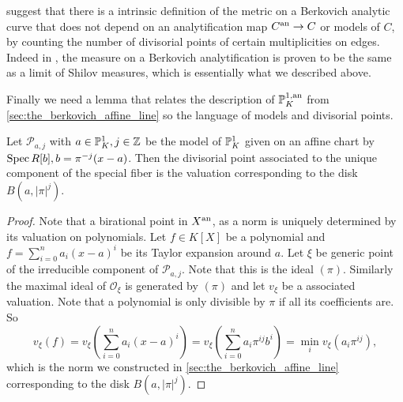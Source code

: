 \begin{remark}
	 suggest that there is a intrinsic definition of the metric on a Berkovich analytic curve that does not depend on an analytification map $ C{}^{\text{an}} \to C$ or models of $C$, by counting the number of divisorial points of certain multiplicities on edges. 
	Indeed in \cite{jonssonConvergenceAdicPluricanonical2020a}, the measure on a Berkovich analytification is proven to be the same as a limit of Shilov measures, which is essentially what we described above. 
\end{remark}

Finally we need a lemma that relates the description of $\mathbb{P}^{1, \text{an}}_{K}$ from \cref{sec:the_berkovich_affine_line} so the language of models and divisorial points. 

\begin{lemma}\label{lem:model_disk_proj_line}
	Let $\mathscr P_{a,j}$ with $a \in \mathbb{P}_K^{1}, j \in \mathbb{Z}$ be the model of $\mathscr {\mathbb{P}}_{K}^{1}$ given on an affine chart by $\operatorname{Spec} R[b], b = \pi^{-j}(x - a)$.
	Then the divisorial point associated to the unique component of the special fiber is the valuation corresponding to the disk $B(a, |\pi|^{j})$. 
\end{lemma}
\begin{proof}
	Note that a birational point in $X{}^{\text{an}}$, as a norm is uniquely determined by its valuation on polynomials. 
	Let $f \in K[X]$ be a polynomial and $f = \sum_{i = 0}^{n} a_i (x - a)^{i} $ be its Taylor expansion around $a$. 
	Let $\xi$ be generic point of the irreducible component of $\mathscr P_{a, j}$. 
	Note that this is the ideal $(\pi)$.
	Similarly the maximal ideal of $\mathcal{O}_{\xi}$ is generated by $(\pi)$ and let $v_{\xi}$ be a associated valuation.
	Note that a polynomial is only divisible by $\pi$ if all its coefficients are.
	So \[
		v_\xi(f) = v_\xi\left( \sum_{i = 0}^{n} a_{i} (x-a)^{i} \right) = v_\xi\left( \sum_{i = 0}^{n} a_i\pi^{ij}b^{i} \right) = \min_{i} v_{\xi}(a_i \pi^{ij}) 
	,\]
	which is the norm we constructed in \cref{sec:the_berkovich_affine_line} corresponding to the disk $B(a, |\pi|^{j})$.
\end{proof}



